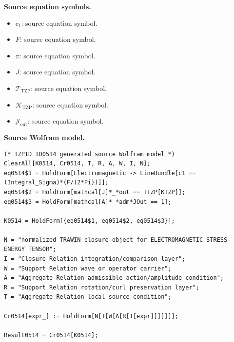 \begin{minipage}[t]{0.49\linewidth}
\begingroup
\small
\raggedright
\textbf{Source equation symbols.}\par
\begin{itemize}[leftmargin=1.35em,itemsep=1pt,topsep=1pt,parsep=0pt]
    \item $c_1$: source equation symbol.
    \item $F$: source equation symbol.
    \item $\pi$: source equation symbol.
    \item $J$: source equation symbol.
    \item $\mathcal{T}_{\mathrm{TZP}}$: source equation symbol.
    \item $\mathcal{K}_{\mathrm{TZP}}$: source equation symbol.
    \item $\mathcal{J}_{\mathrm{out}}$: source equation symbol.
\end{itemize}
\endgroup
\end{minipage}\hfill
\begin{minipage}[t]{0.47\linewidth}
\begingroup
\scriptsize
\raggedright
\textbf{Source Wolfram model.}\par
\begin{Verbatim}[fontsize=\tiny,breaklines=true,breakanywhere=true]
(* TZPID ID0514 generated source Wolfram model *)
ClearAll[K0514, Cr0514, T, R, A, W, I, N];
eq0514$1 = HoldForm[Electromagnetic -> LineBundle[c1 == (Integral_Sigma)*(F/(2*Pi))]];
eq0514$2 = HoldForm[mathcal[J]*_*out == TTZP[KTZP]];
eq0514$3 = HoldForm[mathcal[A]*_*adm*JOut == 1];

K0514 = HoldForm[{eq0514$1, eq0514$2, eq0514$3}];

N = "normalized TRAWIN closure object for ELECTROMAGNETIC STRESS-ENERGY TENSOR";
I = "Closure Relation integration/comparison layer";
W = "Support Relation wave or operator carrier";
A = "Aggregate Relation admissible action/amplitude condition";
R = "Support Relation rotation/curl preservation layer";
T = "Aggregate Relation local source condition";

Cr0514[expr_] := HoldForm[N[I[W[A[R[T[expr]]]]]]];

Result0514 = Cr0514[K0514];
\end{Verbatim}
\endgroup
\end{minipage}

